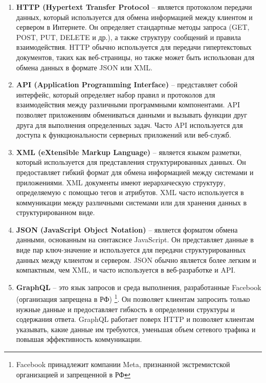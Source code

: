 \begin{enumerate}
    \item \textbf{HTTP (Hypertext Transfer Protocol} -- является протоколом передачи данных, который используется для обмена информацией между клиентом и сервером в Интернете. 
    Он определяет стандартные методы запроса (GET, POST, PUT, DELETE и др.), а также структуру сообщений и правила взаимодействия. 
    HTTP обычно используется для передачи гипертекстовых документов, таких как веб-страницы, 
    но также может быть использован для обмена данных в формате JSON или XML.

    \item \textbf{API (Application Programming Interface)} -- представляет собой интерфейс, который определяет набор правил и протоколов 
    для взаимодействия между различными программными компонентами. 
    API позволяет приложениям обмениваться данными и вызывать функции друг друга для выполнения определенных задач. 
    Часто API используется для доступа к функциональности серверных приложений или веб-служб.
    
    \item \textbf{XML (eXtensible Markup Language)} -- является языком разметки, который используется для представления структурированных данных. 
    Он предоставляет гибкий формат для обмена информацией между системами и приложениями. 
    XML документы имеют иерархическую структуру, определяемую с помощью тегов и атрибутов. 
    XML часто используется в коммуникации между различными системами или для хранения данных в структурированном виде.
    
    \item \textbf{JSON (JavaScript Object Notation)} -- является форматом обмена данными, основанным на синтаксисе JavaScript. 
    Он представляет данные в виде пар ключ-значение и используется для передачи структурированных данных между клиентом и сервером. 
    JSON обычно является более легким и компактным, чем XML, и часто используется в веб-разработке и API.
    
    \item \textbf{GraphQL} -- это язык запросов и среда выполнения, разработанные Facebook (организация запрещена в РФ)
    \footnote{Facebook принадлежит компании Meta, признанной экстремистской организацией и запрещенной в РФ}. 
    Он позволяет клиентам запросить только нужные данные и предоставляет гибкость в определении структуры и содержания ответа. 
    GraphQL работает поверх HTTP и позволяет клиентам указывать, какие данные им требуются, 
    уменьшая объем сетевого трафика и повышая эффективность коммуникации.
    
\end{enumerate}

